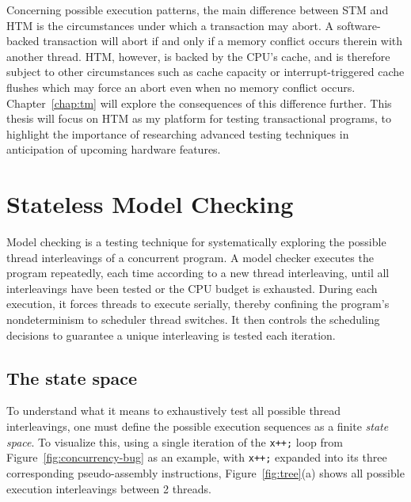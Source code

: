 Concerning possible execution patterns,
the main difference between STM and HTM is the circumstances under which a transaction may abort.
A software-backed transaction will abort if and only if a memory conflict occurs therein with another thread.
HTM, however, is backed by the CPU's cache, and is therefore subject to other circumstances such as cache capacity or interrupt-triggered cache flushes which may force an abort even when no memory conflict occurs.
Chapter~\ref{chap:tm} will explore the consequences of this difference further.
%
This thesis will focus on HTM as my platform for testing transactional programs,
to highlight the importance of researching advanced testing techniques in anticipation of upcoming hardware features.


\section{Stateless Model Checking}
\label{sec:overview-stateless} %

Model checking \cite{verisoft} is a testing technique for systematically exploring the possible thread interleavings of a concurrent program.
A model checker executes the program repeatedly, each time according to a new thread interleaving, until all interleavings have been tested or the CPU budget is exhausted.
During each execution, it forces threads to execute serially, thereby confining the program's nondeterminism to scheduler thread switches.
It then controls the scheduling decisions
to guarantee a unique interleaving is tested each iteration.

\subsection{The state space}
\label{sec:overview-statespace}

To understand what it means to exhaustively test all possible thread interleavings,
one must define the possible execution sequences as a finite {\em state space}.
To visualize this,
using a single iteration of the {\tt x++;} loop from Figure~\ref{fig:concurrency-bug} as an example,
with {\tt x++;} expanded into its three corresponding pseudo-assembly instructions,
Figure~\ref{fig:tree}(a) shows all possible execution interleavings
between 2 threads.

